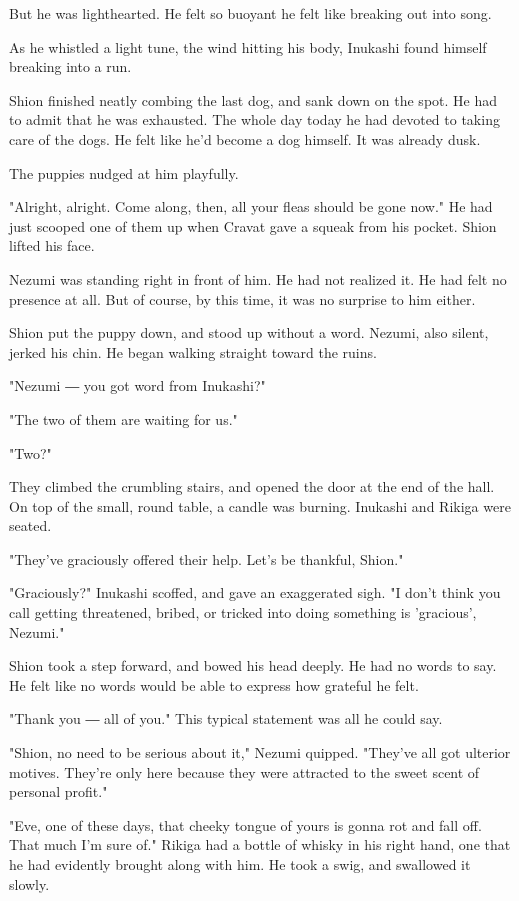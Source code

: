 But he was lighthearted. He felt so buoyant he felt like breaking out
into song.

As he whistled a light tune, the wind hitting his body, Inukashi found
himself breaking into a run.

Shion finished neatly combing the last dog, and sank down on the spot.
He had to admit that he was exhausted. The whole day today he had
devoted to taking care of the dogs. He felt like he'd become a dog
himself. It was already dusk.

The puppies nudged at him playfully.

"Alright, alright. Come along, then, all your fleas should be gone now."
He had just scooped one of them up when Cravat gave a squeak from his
pocket. Shion lifted his face.

Nezumi was standing right in front of him. He had not realized it. He
had felt no presence at all. But of course, by this time, it was no
surprise to him either.

Shion put the puppy down, and stood up without a word. Nezumi, also
silent, jerked his chin. He began walking straight toward the ruins.

"Nezumi ― you got word from Inukashi?"

"The two of them are waiting for us."

"Two?"

They climbed the crumbling stairs, and opened the door at the end of the
hall. On top of the small, round table, a candle was burning. Inukashi
and Rikiga were seated.

"They've graciously offered their help. Let's be thankful, Shion."

"Graciously?" Inukashi scoffed, and gave an exaggerated sigh. "I don't
think you call getting threatened, bribed, or tricked into doing
something is 'gracious', Nezumi."

Shion took a step forward, and bowed his head deeply. He had no words to
say. He felt like no words would be able to express how grateful he
felt.

"Thank you ― all of you." This typical statement was all he could say.

"Shion, no need to be serious about it," Nezumi quipped. "They've all
got ulterior motives. They're only here because they were attracted to
the sweet scent of personal profit."

"Eve, one of these days, that cheeky tongue of yours is gonna rot and
fall off. That much I'm sure of." Rikiga had a bottle of whisky in his
right hand, one that he had evidently brought along with him. He took a
swig, and swallowed it slowly.

